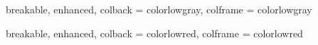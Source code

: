 {
  breakable,
  enhanced,
  colback  = colorlowgray,
  colframe = colorlowgray
}


{
  breakable,
  enhanced,
  colback  = colorlowred,
  colframe = colorlowred
}
